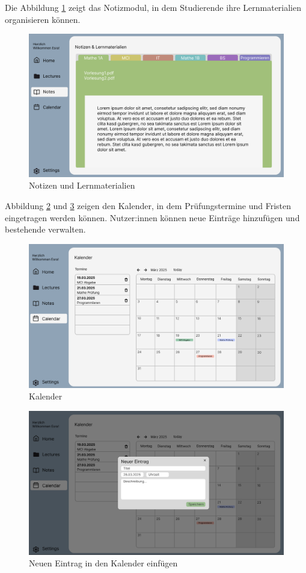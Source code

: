  Die Abbildung \ref{fig:notes} zeigt das Notizmodul, in dem Studierende ihre Lernmaterialien organisieren können.
\begin{figure}[H]
  \centering
  \includegraphics[width=1\textwidth]{./images/notespage.png}
  \caption{Notizen und Lernmaterialien}
  \label{fig:notes}
\end{figure}
Abbildung \ref{fig:calendar-1} und \ref{fig:calendar-2} zeigen den Kalender, in dem Prüfungstermine und Fristen eingetragen werden können. Nutzer:innen können neue Einträge hinzufügen und bestehende verwalten.
\begin{figure}[H]
  \centering
  \includegraphics[width=1\textwidth]{./images/calendarpage-1.png}
  \caption{Kalender}
  \label{fig:calendar-1}
\end{figure}

\begin{figure}[H]
  \centering
  \includegraphics[width=1\textwidth]{./images/calendarpage-2.png}
  \caption{Neuen Eintrag in den Kalender einfügen}
  \label{fig:calendar-2}
\end{figure}